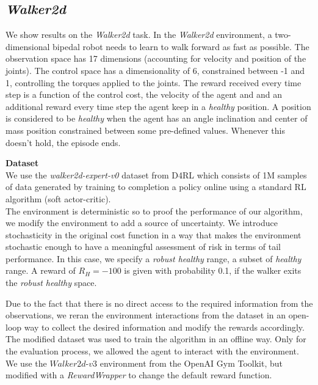 \clearpage

\subsection{\textit{Walker2d}}

We show results on the \textit{Walker2d} task.
In the \textit{Walker2d} environment, a two-dimensional bipedal robot needs to learn to walk forward
as fast as possible.
The observation space has 17 dimensions (accounting for velocity and position of the joints).
The control space has a dimensionality of 6, constrained between -1 and 1, 
controlling the torques applied to the joints.
The reward received every time step is a function of the control cost, the velocity of the agent and 
and an additional reward every time step the agent keep in a \textit{healthy} position.
A position is considered to be \textit{healthy} when the agent has an angle inclination and center of mass
position constrained between some pre-defined values. Whenever this doesn't hold, the episode ends.

\textbf{Dataset}\\
We use the \textit{walker2d-expert-v0} dataset from D4RL which consists of 1M samples of data generated by
training to completion a policy online using a standard RL algorithm (soft actor-critic).\\
The environment is deterministic so to proof the performance of our algorithm, we modify the environment to
add a source of uncertainty. We introduce stochasticity in the original cost function in a way that 
makes the environment stochastic enough to have a meaningful assessment of risk in terms of 
tail performance.
In this case, we specify a \textit{robust healthy} range, a subset of \textit{healthy} range.
A reward of $R_H=-100$ is given with probability 0.1, if the walker exits the \textit{robust healthy} space.

Due to the fact that there is no direct access to the required information from the observations,
we reran the environment interactions from the dataset in an open-loop way to collect the desired information and 
modify the rewards accordingly.
The modified dataset was used to train the algorithm in an offline way.
Only for the evaluation process, we allowed the agent to interact with the environment.
We use the $\textit{Walker2d-v3}$ environment from the OpenAI Gym Toolkit, but modified with a 
\textit{RewardWrapper} to change the default reward function.\\


